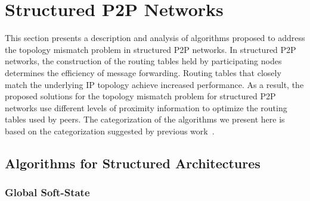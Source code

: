 \section{Structured P2P Networks}
\label{section:structured}

This section presents a description and analysis of algorithms proposed
to address the topology mismatch problem in structured P2P networks.
In structured P2P networks, the construction of the routing tables
held by participating nodes determines the efficiency of message forwarding.
Routing tables that closely match the underlying IP topology
achieve increased performance. As a result, the proposed solutions for
the topology mismatch problem for structured P2P networks 
use different levels of proximity
information to optimize the routing tables used by peers.  
The categorization of the algorithms we present here is based on the
categorization suggested by previous 
work~\cite{CDHR2002,CDCR2002,RSS2002}.

\subsection{Algorithms for Structured Architectures}


\subsubsection{Global Soft-State}


